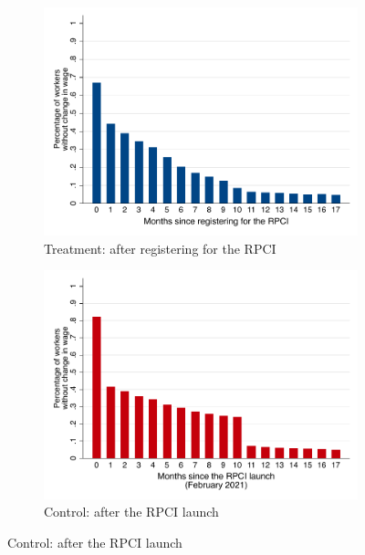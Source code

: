 \documentclass[oneside,11pt]{article}
\begin{document}
\begin{figure}[H]
    \caption{Percentage of workers having the same wage after the RPCI}
    \label{hist_wage_time_since_treated}
    \begin{center}
    
    \begin{subfigure}{0.49\textwidth}
    \caption{Treatment: after registering for the RPCI}
    \includegraphics[width=\textwidth]{04_Figures/muestra_1porciento/hist_wage_time_since_treated_treat.pdf}
    \end{subfigure}
    \begin{subfigure}{0.49\textwidth}
    \caption{Control: after the RPCI launch}
    \includegraphics[width=\textwidth]{04_Figures/muestra_1porciento/hist_wage_time_since_treated_control.pdf}
    \end{subfigure}
    
    \end{center}
\end{figure}
\end{document}
